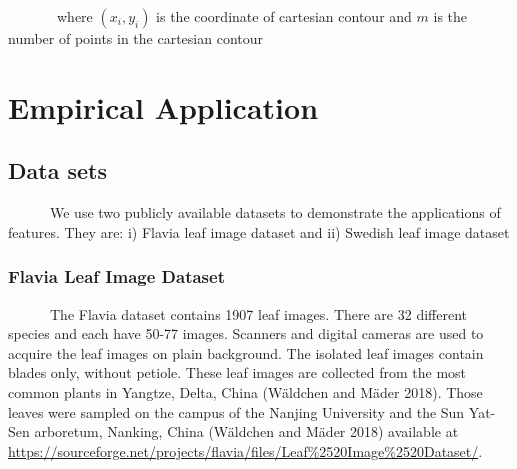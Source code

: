 \documentclass{article}
\begin{document}
~~~~~~~where \((x_i,y_i)\) is the coordinate of cartesian contour and
\(m\) is the number of points in the cartesian contour

\hypertarget{empirical-application}{%
\section{Empirical Application}\label{empirical-application}}

\hypertarget{data-sets}{%
\subsection{Data sets}\label{data-sets}}

~~~~~~We use two publicly available datasets to demonstrate the
applications of features. They are: i) Flavia leaf image dataset and ii)
Swedish leaf image dataset

\hypertarget{flavia-leaf-image-dataset}{%
\subsubsection{Flavia Leaf Image
Dataset}\label{flavia-leaf-image-dataset}}

~~~~~~The Flavia dataset contains 1907 leaf images. There are 32
different species and each have 50-77 images. Scanners and digital
cameras are used to acquire the leaf images on plain background. The
isolated leaf images contain blades only, without petiole. These leaf
images are collected from the most common plants in Yangtze, Delta,
China (Wäldchen and Mäder 2018). Those leaves were sampled on the campus
of the Nanjing University and the Sun Yat-Sen arboretum, Nanking, China
(Wäldchen and Mäder 2018) available at
\url{https://sourceforge.net/projects/flavia/files/Leaf%2520Image%2520Dataset/}.
\end{document}
